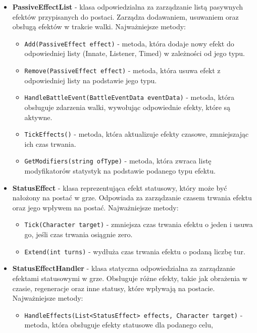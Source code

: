 \begin{itemize}
\begin{itemize}
            \end{itemize}
        \item \textbf{PassiveEffectList} - klasa odpowiedzialna za zarządzanie listą pasywnych efektów przypisanych do postaci.
        Zarządza dodawaniem, usuwaniem oraz obsługą efektów w trakcie walki. Najważniejsze metody:
            \begin{itemize}
                \item \texttt{Add(PassiveEffect effect)} - metoda, która dodaje nowy efekt do odpowiedniej listy (Innate, Listener, Timed) w zależności od jego typu.
                \item \texttt{Remove(PassiveEffect effect)} - metoda, która usuwa efekt z odpowiedniej listy na podstawie jego typu.
                \item \texttt{HandleBattleEvent(BattleEventData eventData)} - metoda, która obsługuje zdarzenia walki, wywołując odpowiednie efekty, które są aktywne.
                \item \texttt{TickEffects()} - metoda, która aktualizuje efekty czasowe, zmniejszając ich czas trwania.
                \item \texttt{GetModifiers(string ofType)} - metoda, która zwraca listę modyfikatorów statystyk na podstawie podanego typu efektu.
            \end{itemize}
        \item \textbf{StatusEffect} - klasa reprezentująca efekt statusowy, który może być nałożony na postać w grze. Odpowiada za zarządzanie czasem trwania efektu oraz jego wpływem na postać. Najważniejsze metody:
            \begin{itemize}
                \item \texttt{Tick(Character target)} - zmniejsza czas trwania efektu o jeden i usuwa go, jeśli czas trwania osiągnie zero.
                \item \texttt{Extend(int turns)} - wydłuża czas trwania efektu o podaną liczbę tur.
            \end{itemize}
        \item \textbf{StatusEffectHandler} - klasa statyczna odpowiedzialna za zarządzanie efektami statusowymi w grze. 
        Obsługuje różne efekty, takie jak obrażenia w czasie, regeneracje oraz inne statusy, które wpływają na postacie. Najważniejsze metody:
            \begin{itemize}
                \item \texttt{HandleEffects(List<StatusEffect> effects, Character target)} - metoda, która obsługuje efekty statusowe dla podanego celu, 

\end{itemize}
\end{itemize}
